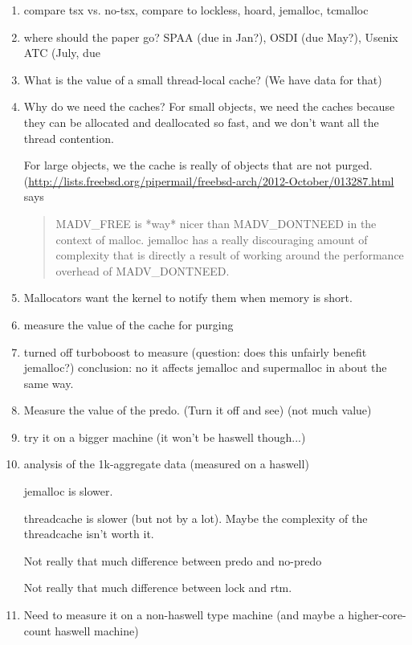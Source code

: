 \begin{enumerate}
 \item compare tsx vs. no-tsx, compare to lockless, hoard, jemalloc, tcmalloc

 \item where should the paper go?  SPAA (due in Jan?), OSDI (due May?), Usenix ATC (July, due

 \item What is the value of a small thread-local cache? (We have data for that)

 \item Why do we need the caches?
  For small objects, we need the caches because they can be allocated and deallocated so fast, and we don't want all the thread contention.

  For large objects, we the cache is really of objects that are not purged.  (\url{http://lists.freebsd.org/pipermail/freebsd-arch/2012-October/013287.html} says 
\begin{quote}
MADV\_FREE is *way* nicer than MADV\_DONTNEED in the context of malloc.  jemalloc has a really discouraging amount of complexity that is directly a result of working around the performance overhead of MADV\_DONTNEED.
\end{quote}
 
 \item Mallocators want the kernel to notify them when memory is short.

 \item measure the value of the cache for purging

 \item turned off turboboost to measure (question: does this unfairly benefit jemalloc?)
   conclusion: no it affects jemalloc and supermalloc in about the same way.

\item Measure the value of the predo.  (Turn it off and see) (not much value)

\item try it on a bigger machine (it won't be haswell though...)

\item analysis of the 1k-aggregate data (measured on a haswell)

 jemalloc is slower.

 threadcache is slower (but not by a lot).  Maybe the complexity of the threadcache isn't worth it.

 Not really that much difference between predo and no-predo

 Not really that much difference between lock and rtm.

\item Need to measure it on a non-haswell type machine (and maybe a higher-core-count haswell machine)


\end{enumerate}
